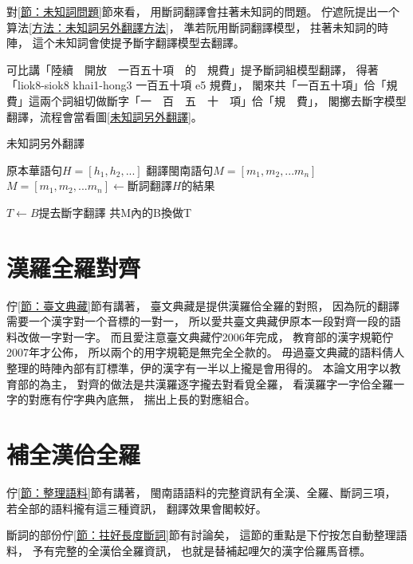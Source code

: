 對\ref{節：未知詞問題}節來看，
用斷詞翻譯會拄著未知詞的問題。
佇遮阮提出一个算法\ref{方法：未知詞另外翻譯方法}，
準若阮用斷詞翻譯模型，
拄著未知詞的時陣，
這个未知詞會使提予斷字翻譯模型去翻譯。

可比講「陸續　開放　一百五十項　的　規費」提予斷詞組模型翻譯，
得著「liok8-siok8 khai1-hong3 一百五十項 e5 規費」，
閣來共「一百五十項」佮「規費」這兩个詞組切做斷字「一　百　五　十　項」佮「規　費」，
閣擲去斷字模型翻譯，流程會當看圖\ref{未知詞另外翻譯}。

\begin{algorithm}
  \caption{未知詞另外翻譯}
  \label{方法：未知詞另外翻譯方法}
  \begin{algorithmic}
    \REQUIRE \( 原本華語句H = [h_{1}, h_{2},...] \)
    \ENSURE \( 翻譯閩南語句M = [m_{1}, m_{2},...m_{n}] \)
    \STATE \( M = [m_{1}, m_{2},...m_{n}] \gets 斷詞翻譯H的結果 \)
    
		\STATE \( T \gets B提去斷字翻譯 \)
		\STATE 共M內的B換做T
	\ENDWHILE
  \end{algorithmic}
\end{algorithm}


\section{漢羅全羅對齊}
\label{節：漢羅全羅對齊}
佇\ref{節：臺文典藏}節有講著，
臺文典藏是提供漢羅佮全羅的對照，
因為阮的翻譯需要一个漢字對一个音標的一對一，
所以愛共臺文典藏伊原本一段對齊一段的語料改做一字對一字。
而且愛注意臺文典藏佇2006年完成，
教育部的漢字規範佇2007年才公佈，
所以兩个的用字規範是無完全仝款的。
毋過臺文典藏的語料倩人整理的時陣內部有訂標準，伊的漢字有一半以上攏是會用得的。
本論文用字以教育部的為主，
對齊的做法是共漢羅逐字攏去對看覓全羅，
看漢羅字一字佮全羅一字的對應有佇字典內底無，
揣出上長的對應組合。


\section{補全漢佮全羅}
\label{節：補全漢佮全羅}
佇\ref{節：整理語料}節有講著，
閩南語語料的完整資訊有全漢、全羅、斷詞三項，
若全部的語料攏有這三種資訊，
翻譯效果會閣較好。

斷詞的部份佇\ref{節：拄好長度斷詞}節有討論矣，
這節的重點是下佇按怎自動整理語料，
予有完整的全漢佮全羅資訊，
也就是替補起哩欠的漢字佮羅馬音標。

